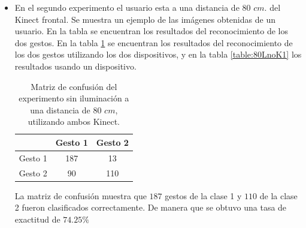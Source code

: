 \begin{itemize}
La matriz de confusión muestra que $154$ gestos de la clase 1 y $133$ de la clase 2 fueron clasificados correctamente. De manera que se obtuvo una tasa de exactitud de $46.75 \%$ 


\item En el segundo experimento el usuario esta a una distancia de $80$ $cm.$ del Kinect frontal. Se muestra un ejemplo de las imágenes obtenidas de un usuario. En la tabla se encuentran los resultados del reconocimiento de los dos gestos. En la tabla \ref{table:80LnoK2} se encuentran los resultados del reconocimiento de los dos gestos utilizando los dos dispositivos, y en la tabla \ref{table:80LnoK1} los resultados usando un dispositivo.   


\begin{table}[h!] 
\begin{center}
\begin{tabular}{ r || c | c |} 
 
        & Gesto 1 & Gesto 2 \\ \hline \hline  
Gesto 1 & 187     &  13     \\ \hline  
Gesto 2 & 90     &  110     \\   

\end{tabular}
\end{center} 
\caption{Matriz de confusión del experimento sin iluminación a una distancia de $80$ $cm$, utilizando ambos Kinect.}
\label{table:80LnoK2}
\end{table}  

La matriz de confusión muestra que $187$ gestos de la clase 1 y $110$ de la clase 2 fueron clasificados correctamente. De manera que se obtuvo una tasa de exactitud de $74.25 \%$ 


\end{itemize}

